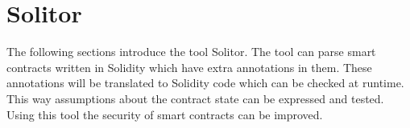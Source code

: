 \documentclass[a4paper]{article}
\begin{document}
\newpage
\section{Solitor}
\label{sec:tooloverview}
The following sections introduce the tool Solitor. The tool can parse smart contracts written in Solidity which have extra annotations in them. These annotations will be translated to Solidity code which can be checked at runtime. This way assumptions about the contract state can be expressed and tested. Using this tool the security of smart contracts can be improved.
\end{document}
